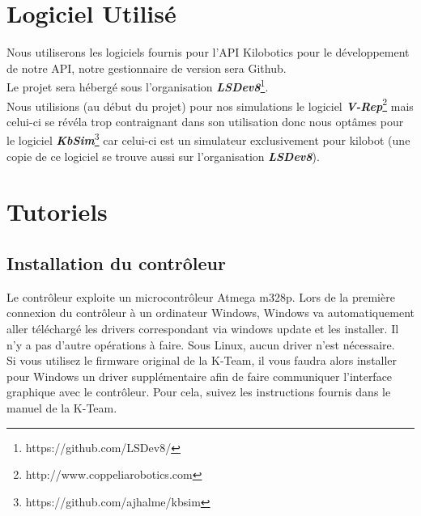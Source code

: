 \documentclass[a4paper,8pt]{report}
\begin{document}
\section*{Logiciel Utilis\'e}\label{sec:name}

Nous utiliserons les logiciels fournis pour l'API Kilobotics pour le d\'eveloppement de notre API, notre gestionnaire de version sera Github.\\
Le projet sera h\'eberg\'e sous l'organisation \textit{\textbf{LSDev8}}\footnote{https://github.com/LSDev8/}.\\
Nous utilisions (au d\'ebut du projet) pour nos simulations le logiciel \textit{\textbf{V-Rep}}\footnote{http://www.coppeliarobotics.com} mais celui-ci se r\'ev\'ela trop contraignant dans son utilisation donc nous opt\^ames pour le logiciel \textit{\textbf{KbSim}}\footnote{https://github.com/ajhalme/kbsim} car celui-ci est un simulateur exclusivement pour kilobot (une copie de ce logiciel se trouve aussi sur l'organisation \textit{\textbf{LSDev8}}).\\


\section*{Tutoriels}\label{sec:name}

\subsection*{Installation du contr\^oleur}\label{sec:name}

Le contr\^oleur exploite un microcontr\^oleur Atmega m328p. Lors de la première connexion du contr\^oleur \`a un ordinateur Windows, Windows va automatiquement aller t\'el\'echarg\'e les drivers correspondant via windows update et les installer. Il n'y a pas d'autre op\'erations \`a faire. Sous Linux, aucun driver n'est n\'ecessaire.\\
Si vous utilisez le firmware original de la K-Team, il vous faudra alors installer pour Windows un driver suppl\'ementaire afin de faire communiquer l'interface graphique avec le contr\^oleur. Pour cela, suivez les instructions fournis dans le manuel de la K-Team.

\begin{center}
\end{center}
\end{document}
